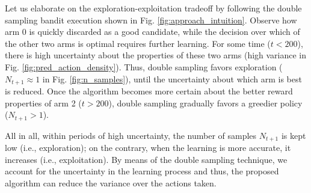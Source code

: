 \documentclass{article}
\newcommand{\ie}{i.e., }
\begin{document}
Let us elaborate on the exploration-exploitation tradeoff by following the double sampling bandit execution shown in Fig. \ref{fig:approach_intuition}. Observe how arm 0 is quickly discarded as a good candidate, while the decision over which of the other two arms is optimal requires further learning. For some time ($t<200$), there is high uncertainty about the properties of these two arms (high variance in Fig. \ref{fig:pred_action_density}). Thus, double sampling favors exploration ($N_{t+1}\approx 1$ in Fig. \ref{fig:n_samples}), until the uncertainty about which arm is best is reduced. Once the algorithm becomes more certain about the better reward properties of arm 2 ($t>200$), double sampling gradually favors a greedier policy ($N_{t+1}>1$).

All in all, within periods of high uncertainty, the number of samples $N_{t+1}$ is kept low (\ie exploration); on the contrary, when the learning is more accurate, it increases (\ie exploitation). By means of the double sampling technique, we account for the uncertainty in the learning process and thus, the proposed algorithm can reduce the variance over the actions taken.
\end{document}
